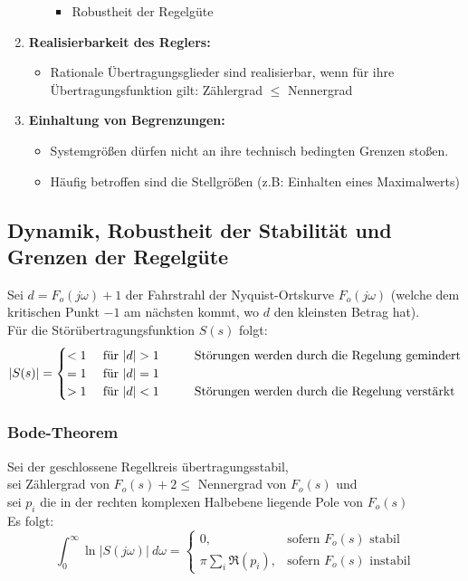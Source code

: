 \documentclass[10pt,a4paper]{article}
\newcommand{\tab}[1][1]{\hspace*{#1cm}}
\begin{document}
\begin{enumerate}
\begin{itemize}
\begin{itemize}
			\item Robustheit der Regelgüte
		\end{itemize}
	\end{itemize}
	\item \textbf{Realisierbarkeit des Reglers:}
	\begin{itemize}
		\item Rationale Übertragungsglieder sind realisierbar, wenn für ihre Übertragungsfunktion gilt: Zählergrad $≤$ Nennergrad
	\end{itemize}
	\item \textbf{Einhaltung von Begrenzungen:}
	\begin{itemize}
		\item Systemgrößen dürfen nicht an ihre technisch bedingten Grenzen stoßen.
		\item Häufig betroffen sind die Stellgrößen (z.B: Einhalten eines Maximalwerts)
	\end{itemize}
\end{enumerate}

\subsection{Dynamik, Robustheit der Stabilität und Grenzen der Regelgüte}
Sei $d = F_o(j \omega) + 1$ der Fahrstrahl der Nyquist-Ortskurve $F_o(j \omega)$ (welche dem kritischen Punkt $-1$ am nächsten kommt, wo $d$ den kleinsten Betrag hat). \\
Für die Störübertragungsfunktion $S(s)$ folgt:
$$
	|S(s)| = \begin{cases}
		< 1 & \text{ für } |d| > 1  \tab\text{Störungen werden durch die Regelung gemindert}\\
		= 1 & \text{ für } |d| = 1 \\
		> 1 & \text{ für } |d| < 1  \tab\text{Störungen werden durch die Regelung verstärkt}\\
	\end{cases}
$$

\subsubsection{Bode-Theorem}
Sei der geschlossene Regelkreis übertragungsstabil, \\
sei Zählergrad von $F_o(s) + 2 ≤ $ Nennergrad von $F_o(s)$ und \\
sei $p_i$ die in der rechten komplexen Halbebene liegende Pole von $F_o(s)$ \\
Es folgt:
$$
	\int_0^∞ \ln|S(j \omega)| ~d \omega = 
	\begin{cases}
		0, & \text{sofern $F_o(s)$ stabil} \\
		\pi \sum_i  \Re(p_i), & \text{sofern $F_o(s)$ instabil}
	\end{cases}
$$
\end{document}
